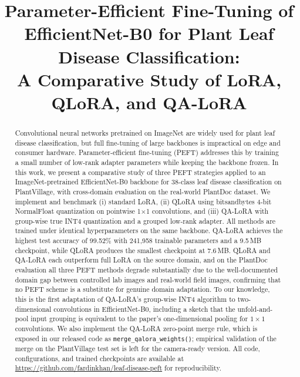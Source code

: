 \documentclass[conference]{IEEEtran}
\begin{document}
\title{Parameter-Efficient Fine-Tuning of EfficientNet-B0 for Plant Leaf Disease Classification: \\A Comparative Study of LoRA, QLoRA, and QA-LoRA}

\author{
}

\maketitle

\begin{abstract}
Convolutional neural networks pretrained on ImageNet are widely used for plant leaf disease classification, but full fine-tuning of large backbones is impractical on edge and consumer hardware. Parameter-efficient fine-tuning (PEFT) addresses this by training a small number of low-rank adapter parameters while keeping the backbone frozen. In this work, we present a comparative study of three PEFT strategies applied to an ImageNet-pretrained EfficientNet-B0 backbone for 38-class leaf disease classification on PlantVillage, with cross-domain evaluation on the real-world PlantDoc dataset. We implement and benchmark (i) standard LoRA, (ii) QLoRA using bitsandbytes 4-bit NormalFloat quantization on pointwise 1$\times$1 convolutions, and (iii) QA-LoRA with group-wise true INT4 quantization and a grouped low-rank adapter. All methods are trained under identical hyperparameters on the same backbone. QA-LoRA achieves the highest test accuracy of 99.52\% with 241{,}958 trainable parameters and a 9.5\,MB checkpoint, while QLoRA produces the smallest checkpoint at 7.6\,MB. QLoRA and QA-LoRA each outperform full LoRA on the source domain, and on the PlantDoc evaluation all three PEFT methods degrade substantially due to the well-documented domain gap between controlled lab images and real-world field images, confirming that no PEFT scheme is a substitute for genuine domain adaptation. To our knowledge, this is the first adaptation of QA-LoRA's group-wise INT4 algorithm to two-dimensional convolutions in EfficientNet-B0, including a sketch that the unfold-and-pool input grouping is equivalent to the paper's one-dimensional pooling for $1\times1$ convolutions. We also implement the QA-LoRA zero-point merge rule, which is exposed in our released code as \texttt{merge\_qalora\_weights()}; empirical validation of the merge on the PlantVillage test set is left for the camera-ready version. All code, configurations, and trained checkpoints are available at \url{https://github.com/fardinkhan/leaf-disease-peft} for reproducibility.
\end{abstract}
\end{document}
